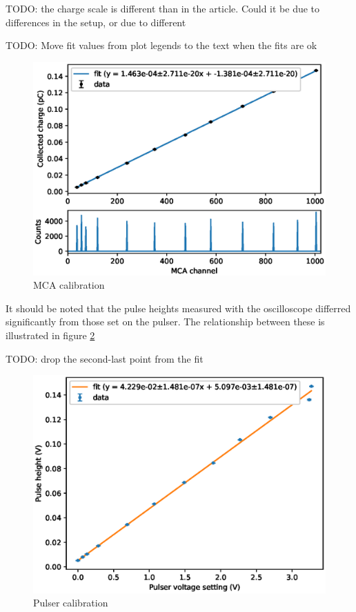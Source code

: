 \documentclass[a4paper]{article}
\begin{document}
TODO: the charge scale is different than in the article.
Could it be due to differences in the setup, or due to different

TODO: Move fit values from plot legends to the text when the fits are ok

\begin{figure}[ht!]
\centering
\includegraphics[width=\textwidth]{fig/python/mca_calibration.eps}
\caption{MCA calibration}
\label{fig:mca_calibration}
\end{figure}

It should be noted that the pulse heights measured with the oscilloscope differred significantly from those set on the pulser.
The relationship between these is illustrated in figure \ref{fig:pulser_calibration}

TODO: drop the second-last point from the fit

\begin{figure}[ht!]
\centering
\includegraphics[width=\textwidth]{fig/python/pulser_calibration.eps}
\caption{Pulser calibration}
\label{fig:pulser_calibration}
\end{figure}
\end{document}
